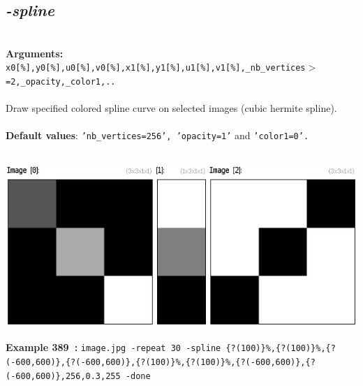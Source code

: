 \documentclass[a4paper,11pt,twoside]{book}
\begin{document}
\subsection{\emph{-spline} }\vspace*{-0.5em}
~\\\textbf{Arguments: } 
{\small \texttt{x0[\%],y0[\%],u0[\%],v0[\%],x1[\%],y1[\%],u1[\%],v1[\%],\_nb\_vertices$>$=2,\_opacity,\_color1,..}}\\~\\
Draw specified colored spline curve on selected images (cubic hermite spline).
~\\~\\\textbf{Default values}: {\small \texttt{'nb\_vertices=256', 'opacity=1'} and \texttt{'color1=0'.}}
\begin{center}\includegraphics[keepaspectratio=true,height=7cm,width=\textwidth]{img/gmic_def389.jpg}\\
{\footnotesize \textbf{Example 389~:} \texttt{image.jpg -repeat 30 -spline \{?(100)\}\%,\{?(100)\}\%,\{?(-600,600)\},\{?(-600,600)\},\{?(100)\}\%,\{?(100)\}\%,\{?(-600,600)\},\{?(-600,600)\},256,0.3,255 -done}}
\end{center}
\end{document}

